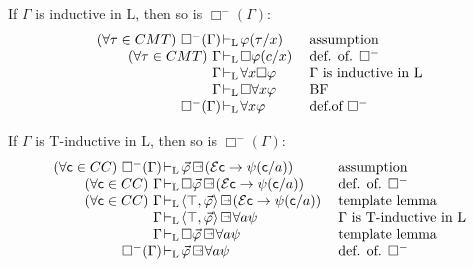 \documentclass[xcolor=x11names]{beamer}
\newcommand{\bemph}[1] {{\color{DeepSkyBlue3}{#1}}}
\newcommand{\lthen}{\rightarrow}
\newcommand{\forallin}[2]{(\forall #1 \in #2)}
\newcommand{\derives}[1][]{\vdash_{\mathrm{#1}}}
\newcommand{\BoxTemplate}[1]{{#1} \mathop{\Box\hspace{-1.35ex} \raisebox{.5ex}{\scalebox{.5}{$\lthen$}}}}
\begin{document}
\begin{frame}[t]
\frametitle{\bemph{($\Box^-$)}}
\footnotesize

If $\Gamma$ is inductive in $\mathrm{L}$, then so is $\Box^-(\Gamma)$:
\[ \arraycolsep=.2mm
\begin{array}{rclcl}
   \forallin {\tau}{CMT} \ \Box^- (\Gamma)&\derives[L]& \varphi (\tau/x)  &\quad& \textup{assumption}
\\ \forallin {\tau}{CMT} \ \Gamma &\derives[L]& \Box \varphi (c/x) && \textup{def. of. $\Box^-$}
\\ \Gamma &\derives[L]& \forall x \Box \varphi && \textup{$\Gamma$ is inductive in L}
\\ \Gamma &\derives[L]& \Box \forall x\varphi && \textup{BF}
\\ \Box^- (\Gamma)&\derives[L]& \forall x \varphi  && \textup{def.of $\Box^-$}
\end{array}
\]

If $\Gamma$ is T-inductive in $\mathrm{L}$, then so is $\Box^-(\Gamma)$:
\[ \arraycolsep=.2mm
\begin{array}{rclcl}
   \forallin {\mathsf c}{CC} \ \Box^- (\Gamma)&\derives[L]& \BoxTemplate{\vec \varphi}\,(\mathcal E \mathsf c \lthen \psi (\mathsf c/a)) &\quad& \textup{assumption}
\\ \forallin {\mathsf c}{CC} \ \Gamma &\derives[L]& \Box \BoxTemplate{\vec \varphi}\,(\mathcal E \mathsf c \lthen \psi (\mathsf c/a)) && \textup{def. of. $\Box^-$}
\\ \forallin {\mathsf c}{CC} \ \Gamma &\derives[L]& \BoxTemplate{\langle \top, \vec \varphi\rangle}\,(\mathcal E \mathsf c \lthen \psi (\mathsf c/a)) && \textup{template lemma}
\\ \Gamma &\derives[L]& \BoxTemplate{\langle \top, \vec \varphi\rangle}\forall a\psi  && \textup{$\Gamma$ is T-inductive in L}
\\ \Gamma &\derives[L]& \Box \BoxTemplate{\vec \varphi}\forall a\psi  && \textup{template lemma}
\\ \Box^- (\Gamma)&\derives[L]& \BoxTemplate{\vec \varphi}\forall a\psi  && \textup{def. of. $\Box^-$}
\end{array}
\]

\end{frame}
\end{document}

